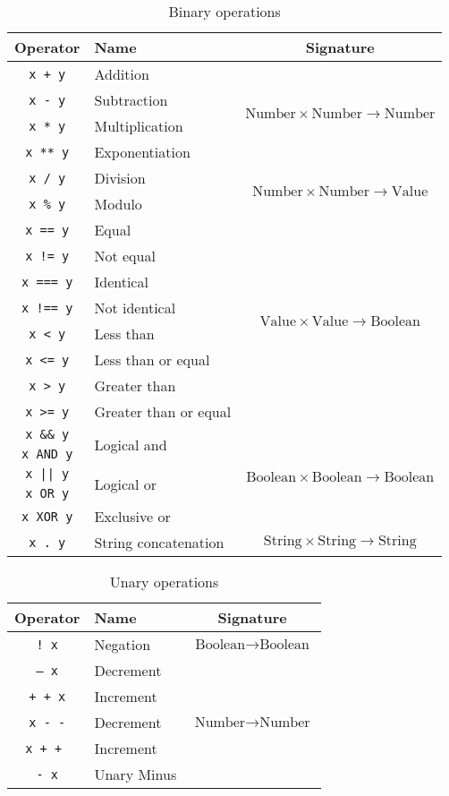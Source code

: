 \begin{table}
\centering
\begin{tabular}{c|l |c}\hline
Operator & Name & Signature\\
\hline\hline

\texttt{x + y} & Addition & \multirow{4}{*}{$ \text{Number} \times \text{Number} \rightarrow \text{Number}$} \\
\texttt{x - y} & Subtraction & \\
\texttt{x * y} & Multiplication & \\
\texttt{x ** y} & Exponentiation & \\\hline
\texttt{x / y} & Division &  \multirow{2}{*}{$ \text{Number} \times \text{Number} \rightarrow \text{Value}$}\\
\texttt{x \% y} & Modulo & \\\hline
\texttt{x == y} & Equal & \multirow{8}{*}{$ \text{Value} \times \text{Value} \rightarrow \text{Boolean}$} \\
\texttt{x != y} & Not equal & \\
\texttt{x === y} & Identical & \\
\texttt{x !== y} & Not identical & \\
\texttt{x < y} & Less than &\\
\texttt{x <= y} & Less than or equal & \\
\texttt{x > y} & Greater than & \\
\texttt{x >= y} & Greater than or equal &\\\hline
\texttt{x \&\& y} & \multirow{2}{*}{Logical and } & \multirow{5}{*}{ $ \text{Boolean} \times \text{Boolean} \rightarrow \text{Boolean}$} \\
\texttt{x AND y} & \\
\texttt{x || y} &  \multirow{2}{*}{Logical or } & \\
\texttt{x OR y} & \\
\texttt{x XOR y} & Exclusive or & \\\hline
\texttt{x . y} & String concatenation & $ \text{String} \times \text{String} \rightarrow \text{String}$ \\\hline
\end{tabular}
\caption{Binary operations\label{tab:binop}}
\end{table}

\begin{table}
\centering
\begin{tabular}{c|l |c}\hline
Operator & Name & Signature\\
\hline\hline
\texttt{! x} & Negation & $\text{Boolean} \rightarrow \text{Boolean}$\\\hline
\texttt{-- x} & Decrement & \multirow{5}{*}{ $\text{Number} \rightarrow \text{Number}$}\\
\texttt{+ + x} & Increment &\\
\texttt{x - -} & Decrement & \\
\texttt{x + + } & Increment & \\
\texttt{- x} & Unary Minus & \\\hline
\end{tabular}
\caption{Unary operations\label{tab:unop}}
\end{table}

